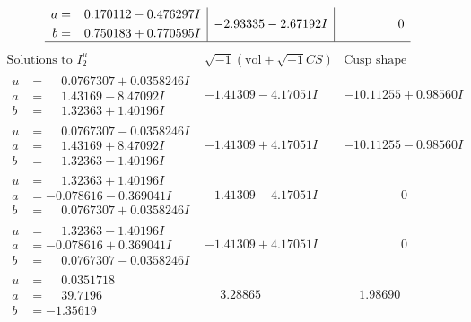 \documentclass[1p]{elsarticle_modified}
\theoremstyle{definition}
\newcommand{\I}{\sqrt{-1}}
\begin{document}
$$\begin{array}{c|c|c}
\begin{aligned}
a &= \phantom{-}0.170112 - 0.476297 I \\
b &= \phantom{-}0.750183 + 0.770595 I\end{aligned}
 & -2.93335 - 2.67192 I & \phantom{-0.000000 } 0\\
 \hline 
 \end{array}$$\newpage$$\begin{array}{c|c|c}  
\text{Solutions to }I^u_{2}& \I (\text{vol} + \sqrt{-1}CS) & \text{Cusp shape}\\
 \hline 
\begin{aligned}
u &= \phantom{-}0.0767307 + 0.0358246 I \\
a &= \phantom{-}1.43169 - 8.47092 I \\
b &= \phantom{-}1.32363 + 1.40196 I\end{aligned}
 & -1.41309 - 4.17051 I & -10.11255 + 0.98560 I \\ \hline\begin{aligned}
u &= \phantom{-}0.0767307 - 0.0358246 I \\
a &= \phantom{-}1.43169 + 8.47092 I \\
b &= \phantom{-}1.32363 - 1.40196 I\end{aligned}
 & -1.41309 + 4.17051 I & -10.11255 - 0.98560 I \\ \hline\begin{aligned}
u &= \phantom{-}1.32363 + 1.40196 I \\
a &= -0.078616 - 0.369041 I \\
b &= \phantom{-}0.0767307 + 0.0358246 I\end{aligned}
 & -1.41309 - 4.17051 I & \phantom{-0.000000 } 0 \\ \hline\begin{aligned}
u &= \phantom{-}1.32363 - 1.40196 I \\
a &= -0.078616 + 0.369041 I \\
b &= \phantom{-}0.0767307 - 0.0358246 I\end{aligned}
 & -1.41309 + 4.17051 I & \phantom{-0.000000 } 0 \\ \hline\begin{aligned}
u &= \phantom{-}0.0351718\phantom{ +0.000000I} \\
a &= \phantom{-}39.7196\phantom{ +0.000000I} \\
b &= -1.35619\phantom{ +0.000000I}\end{aligned}
 & \phantom{-}3.28865\phantom{ +0.000000I} & \phantom{-}1.98690\phantom{ +0.000000I} \\ \hline\begin{aligned}

\end{aligned}
\end{array}$$
\end{document}
